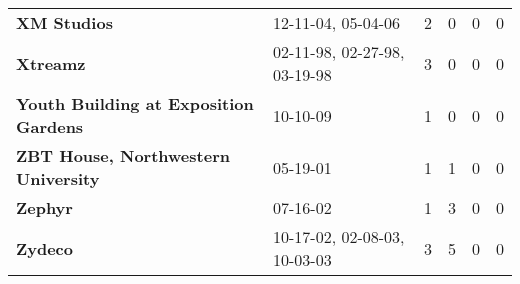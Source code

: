 \begin{supertabular}{llllll}
                                                  \textbf{XM Studios} &            12-11-04, 05-04-06 &  2 &   0 &  0 &  0 \\
                                                     \textbf{Xtreamz} &  02-11-98, 02-27-98, 03-19-98 &  3 &   0 &  0 &  0 \\
                        \textbf{Youth Building at Exposition Gardens} &                      10-10-09 &  1 &   0 &  0 &  0 \\
                          \textbf{ZBT House, Northwestern University} &                      05-19-01 &  1 &   1 &  0 &  0 \\
                                                      \textbf{Zephyr} &                      07-16-02 &  1 &   3 &  0 &  0 \\
                                                      \textbf{Zydeco} &  10-17-02, 02-08-03, 10-03-03 &  3 &   5 &  0 &  0 \\
\end{supertabular}
